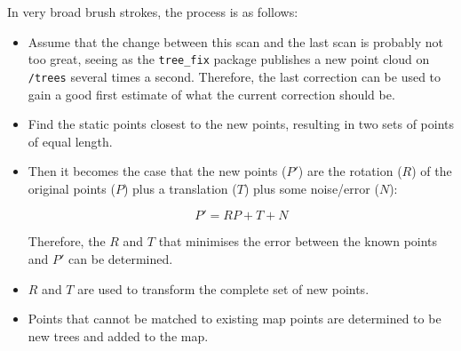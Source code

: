 \documentclass[12pt,oneside,a4paper]{book}
\begin{document}
In very broad brush strokes, the process is as follows:
\begin{itemize}
\item Assume that the change between this scan and the last scan is
  probably not too great, seeing as the \texttt{tree\_fix} package
  publishes a new point cloud on \texttt{/trees} several times a
  second. Therefore, the last correction can be used to gain a good
  first estimate of what the current correction should be.
\item Find the static points closest to the new points, resulting in
  two sets of points of equal length. 
\item Then it becomes the case that the new points ($P'$) are the
  rotation ($R$) of the original points ($P$) plus a translation ($T$)
  plus some noise/error ($N$):

  \begin{equation}
    \label{eq:1}
    P' = RP + T + N
  \end{equation}

  Therefore, the $R$ and $T$ that minimises the error
  between the known points and $P'$ can be determined.
\item $R$ and $T$ are used to transform the complete set of new
  points. 
\item Points that cannot be matched to existing map points are
  determined to be new trees and added to the map.
\end{itemize}
\end{document}
